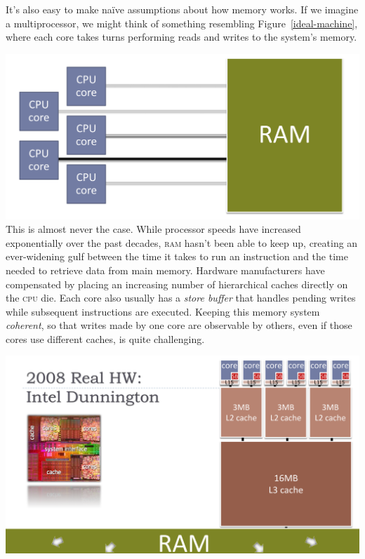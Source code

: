 \documentclass[fontsize=10pt, numbers=endperiod]{scrartcl}
\newcommand{\fig}[1]{Figure~\ref{#1}}
\newcommand{\introduce}[1]{\textit{#1}}
\newenvironment{colfigure}
  {\par\vspace{1\baselineskip minus 0.5\baselineskip}\noindent\minipage{\linewidth}}
  {\endminipage\vspace*{1\baselineskip minus 0.7\baselineskip}}
\begin{document}
\begin{multicols*}{2}
It's also easy to make naïve assumptions about how memory works.
If we imagine a multiprocessor,
we might think of something resembling \fig{ideal-machine},
where each core takes turns performing reads and writes to the system's memory.
\begin{colfigure}
\centering
\includegraphics[keepaspectratio, width=0.8\linewidth]{ideal-machine}
\label{ideal-machine}
\end{colfigure}
This is almost never the case.
While processor speeds have increased exponentially over the past decades,
\textsc{ram} hasn't been able to keep up,
creating an ever-widening gulf between the time it takes to run an
instruction and the time needed to retrieve data from main memory.
Hardware manufacturers have compensated by placing an increasing number of
hierarchical caches directly on the \textsc{cpu} die.
Each core also usually has a \introduce{store buffer} that handles
pending writes while subsequent instructions are executed.
Keeping this memory system \introduce{coherent},
so that writes made by one core are observable by others,
even if those cores use different caches,
is quite challenging.

\begin{colfigure}
\centering
\includegraphics[keepaspectratio, width=\linewidth]{actual-machine}
\label{dunnington}
\end{colfigure}


\end{multicols*}
\end{document}
